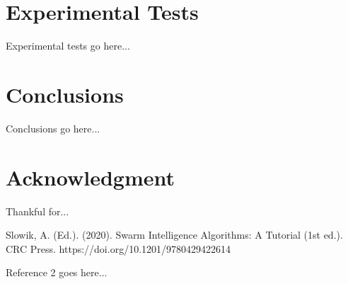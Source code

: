 \documentclass[conference]{IEEEtran}
\begin{document}
\section{Experimental Tests}
Experimental tests go here...

\section{Conclusions}
Conclusions go here...

\section*{Acknowledgment}
Thankful for...

\begin{thebibliography}{1}
    
    
    Slowik, A. (Ed.). (2020). Swarm Intelligence Algorithms: A Tutorial (1st ed.). CRC Press. https://doi.org/10.1201/9780429422614
    
    Reference 2 goes here...
    
\end{thebibliography}
\end{document}
